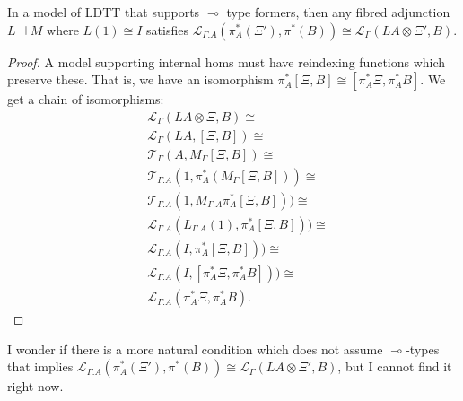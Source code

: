 \begin{thm}In a model of LDTT that supports $\multimap$ type formers, then any fibred adjunction $L \dashv M$ where $L(1) \cong I$ satisfies $\mathcal{L}_{\Gamma.A}(\pi^*_A(\Xi'), \pi^*(B)) \cong \mathcal{L}_{\Gamma}(LA \otimes \Xi', B)$.
  \begin{proof}
    A model supporting internal homs must have reindexing functions which preserve these. That is, we have an isomorphism $\pi_A^*[\Xi, B] \cong [\pi_A^*\Xi, \pi^*_AB]$. We get a chain of isomorphisms:
\[
      \begin{split}
&        \mathcal{L}_{\Gamma}(LA \otimes \Xi, B) \cong \\
 &       \mathcal{L}_{\Gamma}(LA, [\Xi, B]) \cong \\
  &      \mathcal{T}_{\Gamma}(A, M_{\Gamma}[\Xi, B]) \cong \\
 &\mathcal{T}_{\Gamma.A}(1, \pi_A^*(M_{\Gamma}[\Xi, B])) \cong \\
 &\mathcal{T}_{\Gamma.A}(1, M_{\Gamma.A}\pi_A^*[\Xi, B])) \cong \\
  &\mathcal{L}_{\Gamma.A}(L_{\Gamma.A}(1), \pi_A^*[\Xi, B])) \cong \\
 &\mathcal{L}_{\Gamma.A}(I, \pi_A^*[\Xi, B])) \cong \\
 &\mathcal{L}_{\Gamma.A}(I, [\pi_A^*\Xi, \pi_A^*B])) \cong \\
 &\mathcal{L}_{\Gamma.A}(\pi_A^*\Xi, \pi_A^*B).
      \end{split}
\]
  \end{proof}
\end{thm}
I wonder if there is a more natural condition which does not assume $\multimap$-types that implies $\mathcal{L}_{\Gamma.A}(\pi^*_A(\Xi'), \pi^*(B)) \cong \mathcal{L}_{\Gamma}(LA \otimes \Xi', B)$, but I cannot find it right now.
\begin{comment}
Since epimorphisms are preserved by left adjoints, we can precompose with $L_{\Gamma.A}(var)$ to get an isomorphism:
    \[
      \mathcal{L}_{\Gamma.A}(\pi_A^*\Xi', \pi^*_AB) \cong  \mathcal{L}_{\Gamma.A}((L_{\Gamma.A}(\pi_A^*A) \otimes \pi_A^*\Xi'), \pi^*_AB)
    \]
    and since $L_{\Gamma.A}\pi^*_AA \cong \pi^*_AL_\Gamma A$ we get our desired isomorphism by full and faithfulness of $\pi_A^*$.
\end{comment}

